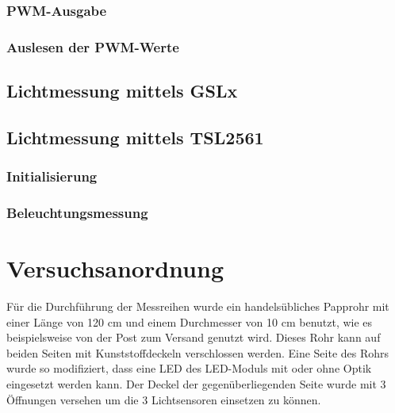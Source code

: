 \documentclass[a4paper,12pt]{scrartcl}
\begin{document}
\subsubsection{PWM-Ausgabe}
\subsubsection{Auslesen der PWM-Werte}
\subsection{Lichtmessung mittels GSLx}

\subsection{Lichtmessung mittels TSL2561}
\subsubsection{Initialisierung}
\subsubsection{Beleuchtungsmessung}

\clearpage
\section{Versuchsanordnung}
Für die Durchführung der Messreihen wurde ein handelsübliches Papprohr mit
einer Länge von 120 cm und einem Durchmesser von 10 cm benutzt, wie es beispielsweise von der Post zum Versand genutzt wird. Dieses Rohr
kann auf beiden Seiten mit Kunststoffdeckeln verschlossen werden. Eine Seite
des Rohrs wurde so modifiziert, dass eine LED des LED-Moduls mit oder ohne
Optik eingesetzt werden kann. Der Deckel der gegenüberliegenden Seite wurde mit
3 Öffnungen versehen um die 3 Lichtsensoren einsetzen zu können.
\end{document}
